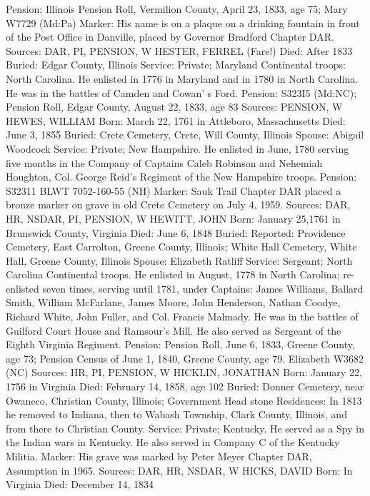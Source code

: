 Pension: Illinois Pension Roll, Vermilion County, April 23, 1833, age 75; Mary W7729 (Md:Pa) 
Marker: His name is on a plaque on a drinking fountain in front of the Post Office in Danville, placed by Governor Bradford Chapter DAR. 
Sources: DAR, PI, PENSION, W 
HESTER, FERREL (Fare!) 
Died: After 1833 
Buried: Edgar County, Illinois 
Service: Private; Maryland Continental troops: North Carolina. He enlisted in 1776 in Maryland and in 1780 in North Carolina. He was in the battles of Camden and Cowan' s Ford.
Pension: S323I5 (Md:NC); Pension Roll, Edgar County, August 22, 1833, age 83 
Sources: PENSION, W 
HEWES, WILLIAM 
Born: March 22, 1761 in Attleboro, Massachusetts 
Died: June 3, 1855 
Buried: Crete Cemetery, Crete, Will County, Illinois 
Spouse: Abigail Woodcock 
Service: Private; New Hampshire. He enlisted in June, 1780 serving five months in the Company of Captains Caleb Robinson and Nehemiah Houghton, Col. George Reid's Regiment of the New Hampshire troops. 
Pension: S32311 BLWT 7052-160-55 (NH) 
Marker: Sauk Trail Chapter DAR placed a bronze marker on grave in old Crete Cemetery on July 4, 1959. 
Sources: DAR, HR, NSDAR, PI, PENSION, W 
HEWITT, JOHN 
Born: January 25,1761 in Brunswick County, Virginia 
Died: June 6, 1848 
Buried: Reported: Providence Cemetery, East Carrolton, Greene County, Illinois; White Hall Cemetery, White Hall, Greene County, Illinois 
Spouse: Elizabeth Ratliff 
Service: Sergeant; North Carolina Continental troops. He enlisted in August, 1778 in North Carolina; re-enlisted seven times, serving until 1781, under Captains: James Williams, Ballard Smith, William McFarlane, James Moore, John Henderson, Nathan Coodye, Richard White, John Fuller, and Col. Francis Malmady. He was in the battles of Guilford Court House and Ram­sour's Mill. He also served as Sergeant of the Eighth Virginia Regiment. 
Pension: Pension Roll, June 6, 1833, Greene County, age 73; Pension Census of June 1, 1840, Greene County, age 79. Elizabeth W3682 (NC) 
Sources: HR, PI, PENSION, W 
HICKLIN, JONATHAN 
Born: January 22, 1756 in Virginia
 Died: February 14, 1858, age 102 
Buried: Donner Cemetery, near Owaneco, Christian County, Illinois; Government Head stone 
Residences: In 1813 he removed to Indiana, then to Wabash Township, Clark County, Illinois, and from there to Christian County. 
Service: Private; Kentucky. He served as a Spy in the Indian wars in Kentucky. He also served in Company C of the Kentucky Militia. 
Marker: His grave was marked by Peter Meyer Chapter DAR, Assumption in 1965. 
Sources: DAR, HR, NSDAR, W 
HICKS, DAVID 
Born: In Virginia 
Died: December 14, 1834 
